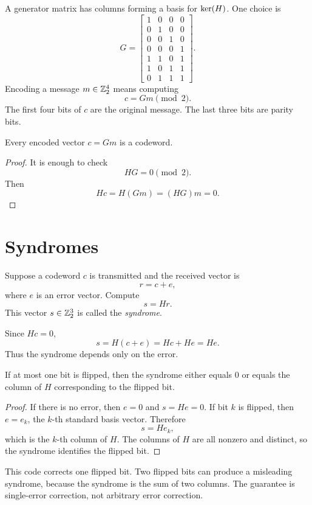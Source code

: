 A generator matrix has columns forming a basis for $\operatorname{ker}(H)$. One choice is
\[
  G=
  \begin{bmatrix}
  1&0&0&0\\
  0&1&0&0\\
  0&0&1&0\\
  0&0&0&1\\
  1&1&0&1\\
  1&0&1&1\\
  0&1&1&1
  \end{bmatrix}.
\]
Encoding a message $m\in\mathbb{Z}_2^4$ means computing
\[
  c=Gm\pmod 2.
\]
The first four bits of $c$ are the original message. The last three bits are
parity bits.

\begin{proposition}
Every encoded vector $c=Gm$ is a codeword.
\end{proposition}

\begin{proof}
It is enough to check
\[
  HG=0\pmod 2.
\]
Then
\[
  Hc=H(Gm)=(HG)m=0.
\]
\end{proof}

\section{Syndromes}

Suppose a codeword $c$ is transmitted and the received vector is
\[
  r=c+e,
\]
where $e$ is an error vector. Compute
\[
  s=Hr.
\]
This vector $s\in\mathbb{Z}_2^3$ is called the \emph{syndrome}.

Since $Hc=0$,
\[
  s=H(c+e)=Hc+He=He.
\]
Thus the syndrome depends only on the error.

\begin{theorem}
If at most one bit is flipped, then the syndrome either equals $0$ or equals
the column of $H$ corresponding to the flipped bit.
\end{theorem}

\begin{proof}
If there is no error, then $e=0$ and $s=He=0$. If bit $k$ is flipped, then
$e=e_k$, the $k$-th standard basis vector. Therefore
\[
  s=He_k,
\]
which is the $k$-th column of $H$. The columns of $H$ are all nonzero and
distinct, so the syndrome identifies the flipped bit.
\end{proof}

\begin{warningbox}
This code corrects one flipped bit. Two flipped bits can produce a misleading
syndrome, because the syndrome is the sum of two columns. The guarantee is
single-error correction, not arbitrary error correction.
\end{warningbox}


